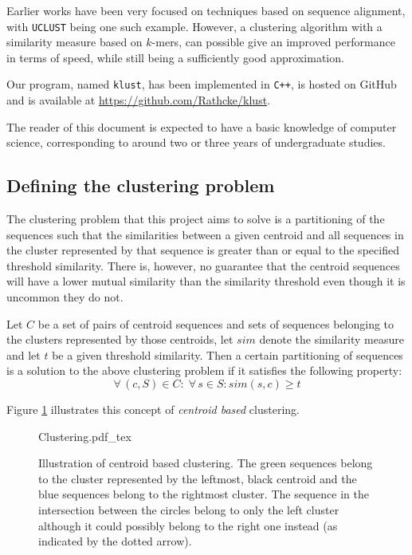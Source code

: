Earlier works have been very focused on techniques based on sequence alignment,
with \texttt{UCLUST} being one such example. However, a clustering algorithm
with a similarity measure based on $k$-mers, can possible give an improved
performance in terms of speed, while still being a sufficiently good
approximation.

Our program, named \texttt{klust}, has been implemented in \texttt{C++}, is
hosted on GitHub and is available at \url{https://github.com/Rathcke/klust}.

The reader of this document is expected to have a basic knowledge of computer
science, corresponding to around two or three years of undergraduate studies.


\subsection{Defining the clustering problem}

The clustering problem that this project aims to solve is a partitioning of the
sequences such that the similarities between a given centroid and all sequences
in the cluster represented by that sequence is greater than or equal to the
specified threshold similarity. There is, however, no guarantee that the
centroid sequences will have a lower mutual similarity than the similarity
threshold even though it is uncommon they do not.

Let $C$ be a set of pairs of centroid sequences and sets of sequences belonging
to the clusters represented by those centroids, let $sim$ denote the similarity
measure and let $t$ be a given threshold similarity. Then a certain
partitioning of sequences is a solution to the above clustering problem if it
satisfies the following property:
\[
  \forall\, (c,S) \in C:\; \forall\, s \in S: sim(s,c) \geq t
\]

Figure \ref{fig:clustering_concept} illustrates this concept of \emph{centroid
based} clustering.

\begin{figure}[h!]
  \centering
  \def\svgwidth{\columnwidth}
  {Clustering.pdf_tex}
  \caption{Illustration of centroid based clustering. The green sequences
    belong to the cluster represented by the leftmost, black centroid and the
    blue sequences belong to the rightmost cluster. The sequence in the
    intersection between the circles belong to only the left cluster although
    it could possibly belong to the right one instead (as indicated by
    the dotted arrow).}
  \label{fig:clustering_concept}
\end{figure}
